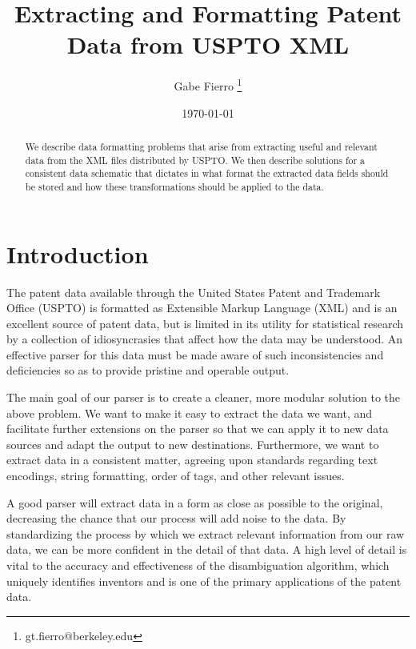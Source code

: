 \documentclass[11pt]{article}
\begin{document}
\title{Extracting and Formatting Patent Data from USPTO XML}
\author{Gabe Fierro
    \thanks{gt.fierro@berkeley.edu}
}
\date{\today}
\maketitle

\begin{abstract}
We describe data formatting problems that arise from extracting useful and
relevant data from the XML files distributed by USPTO. We then describe
solutions for a consistent data schematic that dictates in what format the
extracted data fields should be stored and how these transformations
should be applied to the data.
\end{abstract}

\section{Introduction}

The patent data available through the United States Patent and Trademark Office
(USPTO) is formatted as Extensible Markup Language (XML) and is an excellent
source of patent data, but is limited in its utility for statistical research
by a collection of idiosyncrasies that affect how the data may be understood.
An effective parser for this data must be made aware of such inconsistencies
and deficiencies so as to provide pristine and operable output.

The main goal of our parser is to create a cleaner, more modular solution to
the above problem. We want to make it easy to extract the data we want, and
facilitate further extensions on the parser so that we can apply it to new data
sources and adapt the output to new destinations. Furthermore, we want to
extract data in a consistent matter, agreeing upon standards regarding text
encodings, string formatting, order of tags, and other relevant issues.

A good parser will extract data in a form as close as possible to the original,
decreasing the chance that our process will add noise to the data. By
standardizing the process by which we extract relevant information from our raw
data, we can be more confident in the detail of that data. A high level of
detail is vital to the accuracy and effectiveness of the disambiguation
algorithm, which uniquely identifies inventors and is one of the primary
applications of the patent data.
\end{document}
